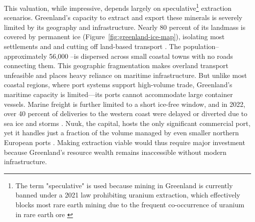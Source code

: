 \documentclass{adonis}
\begin{document}
    This valuation, while impressive, depends largely on speculative\footnote{The term "speculative" is used because mining in Greenland is currently banned under a 2021 law prohibiting uranium extraction, which effectively blocks most rare earth mining due to the frequent co-occurrence of uranium in rare earth ore \citep{thorsson2025greenland}} extraction scenarios. Greenland’s capacity to extract and export these minerals is severely limited by its geography and infrastructure. Nearly 80 percent of its landmass is covered by permanent ice (Figure~\ref{fig:greenland-ice-map}), isolating most settlements and and cutting off land-based transport \citep{britannica2025greenland}. The population–approximately 56,000 \citep{worldbank2024greenland}--is dispersed across small coastal towns with no roads connecting them. This geographic fragmentation makes overland transport unfeasible and places heavy reliance on maritime infrastructure. But unlike most coastal regions, where port systems support high-volume trade, Greenland’s maritime capacity is limited—its ports cannot accommodate large container vessels. Marine freight is further limited to a short ice-free window, and in 2022, over 40 percent of deliveries to the western coast were delayed or diverted due to sea ice and storms \citep{joshi2022ports}. Nuuk, the capital, hosts the only significant commercial port, yet it handles just a fraction of the volume managed by even smaller northern European ports \citep{moller2020current}. Making extraction viable would thus require major investment because Greenland’s resource wealth remains inaccessible without modern infrastructure.
\end{document}
